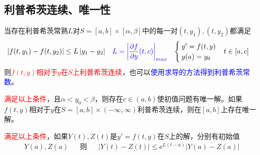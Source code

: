 \documentclass[twocolumn]{article}
\begin{document}
\subsection{利普希茨连续、唯一性}
当存在利普希茨常熟$L$对$S=[a,b]\times[\alpha,\beta]$中的每一对$(t,y_1),(t,y_2)$都满足
\begin{align*}
    \left| f(t,y_1)-f(t,y_2) \right| &\leq L\left| y_1-y_2 \right|&&\textcolor{blue}{L=\left| \frac{\partial f}{\partial y}(t,c) \right|_{max}}& 
    \begin{cases}
        y'=f(t,y)\\
        y(a)=y_0
    \end{cases}
    &t\in[a,c]
\end{align*}
则\textcolor{red}{$f(t,y)$相对于$y$在$S$上利普希茨连续}，也可以\textcolor{blue}{使用求导的方法得到利普希茨常数}。

\textcolor{red}{满足以上条件}，且$\alpha<y_0<\beta$，则存在$c\in(a,b)$使初值问题有唯一解。如果$f(t,y)$相对于$y$在$S=[a,b]\times(-\infty,\infty)$利普希茨连续，则在$[a,b]$上存在唯一解。

\textcolor{red}{满足以上条件}，如果$Y(t),Z(t)$是$y'=f(t,y)$在$S$上的解，分别有初始值
\begin{align*}
    Y(a),Z(a)&&\text{则}&&
    \left| Y(t)-Z(t) \right| \leqslant \mathrm{e}^{L(t-a)} \left| Y(a)-Z(a) \right|
\end{align*}
\end{document}
